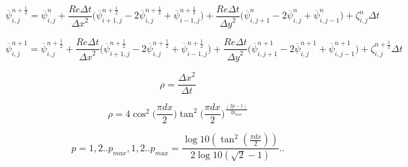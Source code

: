 \begin{equation}
\label{eq:poisson_adi_1} 
 \overline{\psi}_{i,j}^{n+\frac{1}{2}} = \overline{\psi}_{i,j}^{n} +
 \frac{Re \Delta t}{{\Delta x}^2} \big(
 \overline{\psi}_{i+1,j}^{n+\frac{1}{2}} - 2 \overline{\psi}_{i,j}^{n+\frac{1}{2}} + \overline{\psi}_{i-1,j}^{n+\frac{1}{2}}
 \big)  + 
 \frac{Re \Delta t}{{\Delta y}^2} \big(
 \overline{\psi}_{i,j+1}^{n} - 2 \overline{\psi}_{i,j}^{n} + \overline{\psi}_{i,j-1}^{n}
 \big) + \zeta_{i,j}^{n} \Delta t
\end{equation}




\begin{equation}
\label{eq:poisson_adi_2} 
 \overline{\psi}_{i,j}^{n+1} = \overline{\psi}_{i,j}^{n+\frac{1}{2}} +
 \frac{Re \Delta t}{{\Delta x}^2} \big(
 \overline{\psi}_{i+1,j}^{n+\frac{1}{2}} - 2 \overline{\psi}_{i,j}^{n+\frac{1}{2}} + \overline{\psi}_{i-1,j}^{n+\frac{1}{2}}
 \big) + 
 \frac{Re \Delta t}{{\Delta y}^2} \big(
 \overline{\psi}_{i,j+1}^{n+1} - 2 \overline{\psi}_{i,j}^{n+1} + \overline{\psi}_{i,j-1}^{n+1}
 \big) + \zeta_{i,j}^{n+\frac{1}{2}} \Delta t
\end{equation}


\begin{equation}
\label{eq:rho_adi} 
\rho = \frac{{\Delta x}^2}{\Delta t}
\end{equation}

\begin{equation}
\label{eq:rho_opt} 
\rho  = 4\cos^2\big(\frac{\pi dx}{2}\big)\tan^2\big(\frac{\pi dx}{2}\big)^{\frac{(2p-1)}{2p_{max}}}
\end{equation}

\begin{equation}
\label{eq:p_max} 
p = 1,2 .. p_{max},1,2..p_{max} = \frac{\log10(\tan^2(\frac{\pi dx}{2}))}{2\log10(\sqrt2 - 1)}..
\end{equation}
